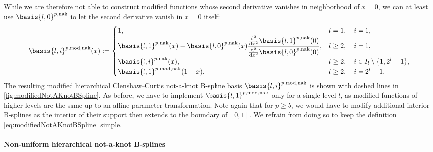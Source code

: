 While we are therefore not able to construct modified functions
whose second derivative vanishes in neighborhood of $x = 0$,
we can at least use $\basis{l,0}^{p,\notaknot}$ to let the
second derivative vanish in $x = 0$ itself:
\begin{equation}
  \label{eq:modifiedNotAKnotBSpline}
  \basis{l,i}^{p,\modified,\notaknot}(x)
  :=
  \begin{cases}
    1,&
    l = 1,\quad i = 1,\\
    \basis{l,1}^{p,\notaknot}(x)
    - \basis{l,0}^{p,\notaknot}(x)
    \dfrac{\frac{\diff^2}{\dx^2} \basis{l,1}^{p,\notaknot}(0)}%
    {\frac{\diff^2}{\dx^2} \basis{l,0}^{p,\notaknot}(0)},&
    l \ge 2,\quad i = 1,\\
    \basis{l,i}^{p,\notaknot}(x),&
    l \ge 2,\quad i \in I_l \setminus \{1, 2^l - 1\},\\
    \basis{l,1}^{p,\modified,\notaknot}(1 - x),&
    l \ge 2,\quad i = 2^l - 1.
  \end{cases}
  \hspace*{-2mm}
\end{equation}
The resulting modified hierarchical Clenshaw--Curtis not-a-knot B-spline basis
$\basis{l,i}^{p,\modified,\notaknot}$ is shown with dashed lines
in \cref{fig:modifiedNotAKnotBSpline}.
As before, we have to implement $\basis{l,1}^{p,\modified,\notaknot}$
only for a single level $l$, as modified functions of higher levels
are the same up to an affine parameter transformation.
Note again that for $p \ge 5$, we would have to modify additional
interior B-splines as the interior of their support then extends to the
boundary of $[0, 1]$.
We refrain from doing so to keep the definition
\eqref{eq:modifiedNotAKnotBSpline} simple.

\paragraph{Non-uniform hierarchical not-a-knot B-splines}

